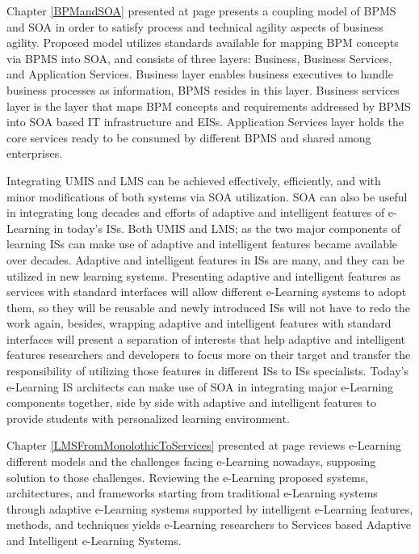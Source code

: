 \documentclass[12pt,a4paper,final,twoside,onecolumn,titlepage]{book}
\begin{document}
Chapter \ref{BPMandSOA} presented at page \pageref{BPMandSOA} presents a coupling model of \gls{BPMS} and \gls{SOA} in order to satisfy process and technical agility aspects of business agility. Proposed model utilizes standards available for mapping \gls{BPM} concepts via \gls{BPMS} into \gls{SOA}, and consists of three layers: Business, Business Services, and Application Services. Business layer enables business executives to handle business processes as information, \gls{BPMS} resides in this layer. Business services layer is the layer that maps \gls{BPM} concepts and requirements addressed by \gls{BPMS} into \gls{SOA} based IT infrastructure and \gls{EIS}s. Application Services layer holds the core services ready to be consumed by different \gls{BPMS} and shared among enterprises.

Integrating \gls{UMIS} and \gls{LMS}  can be achieved effectively, efficiently, and with minor modifications of both systems via \gls{SOA} utilization. \gls{SOA} can also be useful in integrating long decades and efforts of adaptive and intelligent features of e-Learning in today's \gls{IS}s. Both \gls{UMIS} and \gls{LMS}; as the two major components of learning \gls{IS}s can make use of adaptive and intelligent features became available over decades. Adaptive and intelligent features in \gls{IS}s are many, and they can be utilized in new learning systems. Presenting adaptive and intelligent features as services with standard interfaces will allow different e-Learning systems to adopt them, so they will be reusable and newly introduced \gls{IS}s will not have to redo the work again, besides, wrapping adaptive and intelligent features with standard interfaces will present a separation of interests that help adaptive and intelligent features researchers and developers to focus more on their target and transfer the responsibility of utilizing those features in different \gls{IS}s to \gls{IS}s specialists. Today's e-Learning \gls{IS} architects can make use of \gls{SOA} in integrating major e-Learning components together, side by side with adaptive and intelligent features to provide students with personalized learning environment. 

Chapter \ref{LMSFromMonolothicToServices} presented at page \pageref{LMSFromMonolothicToServices} reviews e-Learning different models and the challenges facing e-Learning nowadays, supposing solution to those challenges. Reviewing the e-Learning proposed systems, architectures, and frameworks starting from traditional e-Learning systems through adaptive e-Learning systems supported by intelligent e-Learning features, methods, and techniques yields e-Learning researchers to Services based Adaptive and Intelligent e-Learning Systems.
\end{document}
